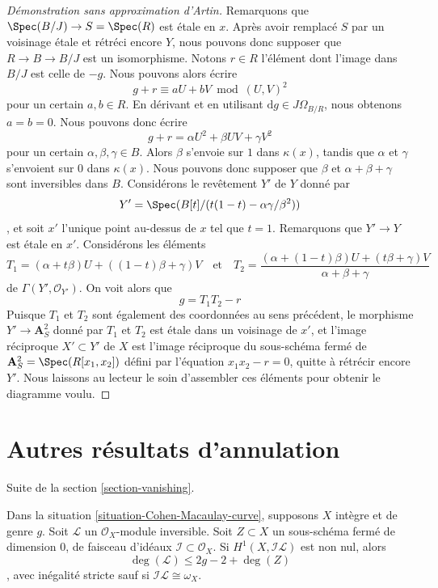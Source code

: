 \begin{proof}[Démonstration sans approximation d'Artin]
\medskip\noindent
Remarquons que $\Spec(B/J) \to S = \Spec(R)$ est étale en $x$. Après avoir remplacé $S$ par un voisinage étale et rétréci encore $Y$, nous pouvons donc supposer que $R \to B \to B/J$ est un isomorphisme. Notons $r \in R$ l'élément dont l'image dans $B/J$ est celle de $-g$. Nous pouvons alors écrire $$
g + r \equiv a U + b V \bmod (U, V)^2
$$ pour un certain $a, b \in R$. En dérivant et en utilisant $\text{d}g \in J\Omega_{B/R}$, nous obtenons $a = b = 0$. Nous pouvons donc écrire $$
g + r = \alpha U^2 + \beta UV + \gamma V^2
$$ pour un certain $\alpha, \beta, \gamma \in B$. Alors $\beta$ s'envoie sur $1$ dans $\kappa(x)$, tandis que $\alpha$ et $\gamma$ s'envoient sur $0$ dans $\kappa(x)$. Nous pouvons donc supposer que $\beta$ et $\alpha + \beta + \gamma$ sont inversibles dans $B$. Considérons le revêtement $Y'$ de $Y$ donné par $$
Y' = \Spec(B[t]/(t(1 - t) - \alpha \gamma / \beta^2))
$$, et soit $x'$ l'unique point au-dessus de $x$ tel que $t = 1$. Remarquons que $Y' \to Y$ est étale en $x'$. Considérons les éléments $$
T_1 = (\alpha + t \beta)U + ((1 - t)\beta + \gamma)V
\quad\text{et}\quad
T_2 =
\frac{(\alpha + (1 - t) \beta)U + (t\beta + \gamma)V}{\alpha + \beta + \gamma}
$$ de $\Gamma(Y', \mathcal{O}_{Y'})$. On voit alors que $$
g = T_1 T_2 - r
$$ Puisque $T_1$ et $T_2$ sont également des coordonnées au sens précédent, le morphisme $Y' \to \mathbf{A}^2_S$ donné par $T_1$ et $T_2$ est étale dans un voisinage de $x'$, et l'image réciproque $X' \subset Y'$ de $X$ est l'image réciproque du sous-schéma fermé de $\mathbf{A}^2_S = \Spec(R[x_1, x_2])$ défini par l'équation $x_1x_2 - r = 0$, quitte à rétrécir encore $Y'$. Nous laissons au lecteur le soin d'assembler ces éléments pour obtenir le diagramme voulu.
\end{proof}
\endgroup




\section{Autres résultats d'annulation}
\label{section-more-vanishing}

\noindent
Suite de la section \ref{section-vanishing}.

\begin{lemma}
\label{lemma-h1-nonzero-degree-leq-2g-2}
Dans la situation \ref{situation-Cohen-Macaulay-curve}, supposons $X$ intègre et de genre $g$. Soit $\mathcal{L}$ un $\mathcal{O}_X$-module inversible. Soit $Z \subset X$ un sous-schéma fermé de dimension $0$, de faisceau d'idéaux $\mathcal{I} \subset \mathcal{O}_X$. Si $H^1(X, \mathcal{I}\mathcal{L})$ est non nul, alors $$
\deg(\mathcal{L}) \leq 2g - 2 + \deg(Z)
$$, avec inégalité stricte sauf si $\mathcal{I}\mathcal{L} \cong \omega_X$.
\end{lemma}

